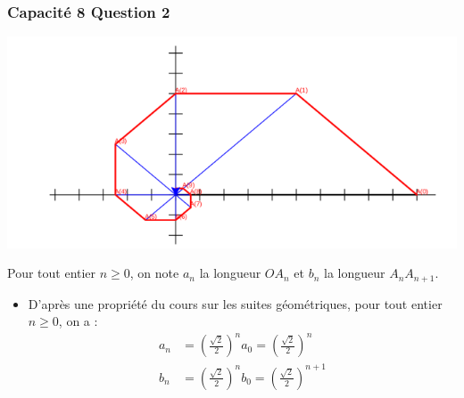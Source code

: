 \documentclass[11pt, hyperref={urlcolor=red,%
            linkcolor=blue, %
            colorlinks=true}]{beamer}
\begin{document}
\begin{frame}
\frametitle{Capacité 8 Question 2}


\begin{center}
\includegraphics[scale=0.2]{images/capacite8.png}
\end{center}



Pour tout entier $n\geqslant 0$, on note $a_{n}$ la longueur $OA_{n}$ et $b_{n}$ la longueur $A_{n}A_{n+1}$.


\begin{itemize}
	\pause \item  D'après une propriété du cours sur les suites géométriques, pour tout entier $n \geqslant 0$, on a :  
\begin{align*}
a_{n} &=\left(\frac{\sqrt{2}}{2}\right)^{n}a_{0}=\left(\frac{\sqrt{2}}{2}\right)^{n}\\
b_{n} &=\left(\frac{\sqrt{2}}{2}\right)^{n}b_{0}=\left(\frac{\sqrt{2}}{2}\right)^{n+1}
\end{align*}
	

\end{itemize}


\end{frame}
\end{document}
